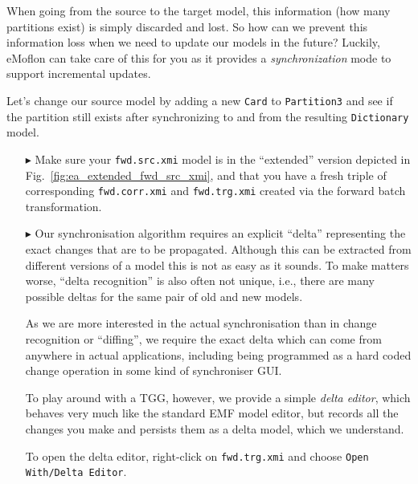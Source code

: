 When going from the source to the target model, this information (how many partitions exist) is simply discarded and lost. 
So how can we prevent this information loss when we need to update our models in the future? Luckily, eMoflon can take care of this for you as it provides a \emph{synchronization} mode to support incremental updates.

Let's change our source model by adding a new \texttt{Card} to \texttt{Partition3} and see if the partition still exists after synchronizing to and from the resulting \texttt{Dictionary} model.

\begin{itemize}
\item[$\blacktriangleright$] Make sure your \texttt{fwd.src.xmi} model is in the ``extended'' version depicted in Fig.~\ref{fig:ea_extended_fwd_src_xmi}, and that you have a fresh triple of corresponding \texttt{fwd.corr.xmi} and \texttt{fwd.trg.xmi} created via the forward batch transformation.

\item[$\blacktriangleright$] Our synchronisation algorithm requires an explicit ``delta'' representing the exact changes that are to be propagated.
Although this can be extracted from different versions of a model this is not as easy as it sounds.
To make matters worse, ``delta recognition'' is also often not unique, i.e., there are many possible deltas for the same pair of old and new models.

As we are more interested in the actual synchronisation than in change recognition or ``diffing'', we require the exact delta which can come from anywhere in actual applications, including being programmed as a hard coded change operation in some kind of synchroniser GUI.

To play around with a TGG, however, we provide a simple \emph{delta editor}, which behaves very much like the standard EMF model editor, but records all the changes you make and persists them as a delta model, which we understand.

To open the delta editor, right-click on \texttt{fwd.trg.xmi} and choose \texttt{Open With/Delta Editor}.


\end{itemize}
